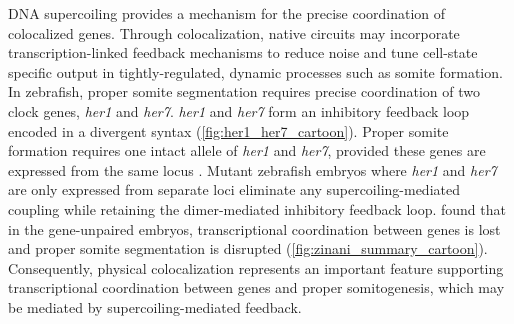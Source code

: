 \documentclass[11pt]{article} %
\begin{document}
DNA supercoiling provides a mechanism for the precise coordination of colocalized genes. Through colocalization, native circuits may incorporate transcription-linked feedback mechanisms to reduce noise and tune cell-state specific output in tightly-regulated, dynamic processes such as somite formation. In zebrafish, proper somite segmentation requires precise coordination of two clock genes, \textit{her1} and \textit{her7}.   \textit{her1} and \textit{her7} form an inhibitory feedback loop encoded in a divergent syntax (\cref{fig:her1_her7_cartoon}). Proper somite formation requires one intact allele of \textit{her1} and \textit{her7}, provided these genes are expressed from the same locus \parencite{zinaniPairingSegmentationClock2021}.  Mutant zebrafish embryos where \emph{her1} and \emph{her7} are only expressed from separate loci eliminate any supercoiling-mediated coupling while retaining the dimer-mediated inhibitory feedback loop. \Textcite{zinaniPairingSegmentationClock2021} found that in the gene-unpaired embryos, transcriptional coordination between genes is lost and proper somite segmentation is disrupted (\cref{fig:zinani_summary_cartoon}). Consequently, physical colocalization represents an important feature supporting transcriptional coordination between genes and proper somitogenesis, which may be mediated by supercoiling-mediated feedback.
\end{document}

